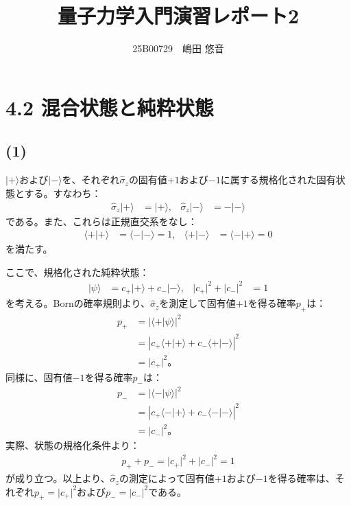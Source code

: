 \documentclass[platex,dvipdfmx,a4paper]{jsarticle}
\title{量子力学入門演習レポート2}
\author{25B00729　嶋田 悠音}
\begin{document}
\maketitle
\section*{4.2 混合状態と純粋状態}
\subsection*{(1)}

$\lvert+\rangle$および$\lvert-\rangle$を、それぞれ$\hat{\sigma}_z$の固有値$+1$および$-1$に属する規格化された固有状態とする。すなわち：
\begin{align*}
  \hat{\sigma}_z\lvert+\rangle&=\lvert+\rangle,
  &
  \hat{\sigma}_z\lvert-\rangle&=-\lvert-\rangle
\end{align*}
である。また、これらは正規直交系をなし：
\begin{align*}
  \langle+|+\rangle&=\langle-|-\rangle=1,
  &
  \langle+|-\rangle&=\langle-|+\rangle=0
\end{align*}
を満たす。

ここで、規格化された純粋状態：
\begin{align*}
  \lvert\psi\rangle
  &=c_+\lvert+\rangle+c_-\lvert-\rangle,
  &
  \lvert c_+\rvert^2+\lvert c_-\rvert^2
  &=1
\end{align*}
を考える。Bornの確率規則より、$\hat{\sigma}_z$を測定して固有値$+1$を得る確率$p_+$は：
\begin{align*}
  p_+
  &=\lvert\langle+|\psi\rangle\rvert^2 \\
  &=\left\lvert c_+\langle+|+\rangle+c_-\langle+|-\rangle\right\rvert^2 \\
  &=\lvert c_+\rvert^2。
\end{align*}
同様に、固有値$-1$を得る確率$p_-$は：
\begin{align*}
  p_-
  &=\lvert\langle-|\psi\rangle\rvert^2 \\
  &=\left\lvert c_+\langle-|+\rangle+c_-\langle-|-\rangle\right\rvert^2 \\
  &=\lvert c_-\rvert^2。
\end{align*}
実際、状態の規格化条件より：
\begin{align*}
  p_++p_-
  =\lvert c_+\rvert^2+\lvert c_-\rvert^2
  =1
\end{align*}
が成り立つ。以上より、$\hat{\sigma}_z$の測定によって固有値$+1$および$-1$を得る確率は、それぞれ$p_+=\lvert c_+\rvert^2$および$p_-=\lvert c_-\rvert^2$である。
\end{document}
